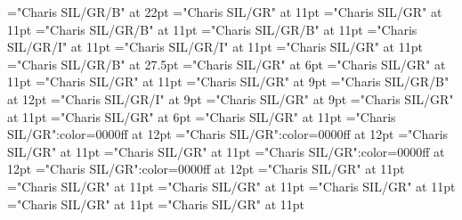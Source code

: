 \documentclass[a4paper,twoside]{article}
\begin{document}
\font\spanzxxTitleMainscrBookscrBody="Charis SIL/GR/B" at 22pt
\font\columnsscrBookscrBody="Charis SIL/GR" at 11pt
\font\scrSectioncolumnsscrBookscrBody="Charis SIL/GR" at 11pt
\font\SectionHeadscrSectioncolumnsscrBookscrBody="Charis SIL/GR/B" at 11pt
\font\spanzxxSectionHeadscrSectioncolumnsscrBookscrBody="Charis SIL/GR/B" at 11pt
\font\ParallelPassageReferencescrSectioncolumnsscrBookscrBody="Charis SIL/GR/I" at 11pt
\font\spanzxxParallelPassageReferencescrSectioncolumnsscrBookscrBody="Charis SIL/GR/I" at 11pt
\font\ParagraphscrSectioncolumnsscrBookscrBody="Charis SIL/GR" at 11pt
\font\ChapterNumberzxxParagraphscrSectioncolumnsscrBookscrBody="Charis SIL/GR/B" at 27.5pt
\font\VerseNumberzxxParagraphscrSectioncolumnsscrBookscrBody="Charis SIL/GR" at 6pt
\font\spanzxxParagraphscrSectioncolumnsscrBookscrBody="Charis SIL/GR" at 11pt
\font\scrFootnoteMarkerParagraphscrSectioncolumnsscrBookscrBody="Charis SIL/GR" at 11pt
\font\NoteGeneralParagraphParagraphscrSectioncolumnsscrBookscrBody="Charis SIL/GR" at 9pt
\font\NoteTargetReferencezxxNoteGeneralParagraphParagraphscrSectioncolumnsscrBookscrBody="Charis SIL/GR/B" at 12pt
\font\QuotedTextzxxNoteGeneralParagraphParagraphscrSectioncolumnsscrBookscrBody="Charis SIL/GR/I" at 9pt
\font\spanzxxNoteGeneralParagraphParagraphscrSectioncolumnsscrBookscrBody="Charis SIL/GR" at 9pt
\font\LinebscrSectioncolumnsscrBookscrBody="Charis SIL/GR" at 11pt
\font\VerseNumberzxxLinebscrSectioncolumnsscrBookscrBody="Charis SIL/GR" at 6pt
\font\spanzxxLinebscrSectioncolumnsscrBookscrBody="Charis SIL/GR" at 11pt
\font\SeeInGlossaryzxxLinebscrSectioncolumnsscrBookscrBody="Charis SIL/GR":color=0000ff at 12pt
\font\GlossaryKeySeeInGlossaryzxxLinebscrSectioncolumnsscrBookscrBody="Charis SIL/GR":color=0000ff at 12pt
\font\LinecscrSectioncolumnsscrBookscrBody="Charis SIL/GR" at 11pt
\font\spanzxxLinecscrSectioncolumnsscrBookscrBody="Charis SIL/GR" at 11pt
\font\SeeInGlossaryzxxParagraphscrSectioncolumnsscrBookscrBody="Charis SIL/GR":color=0000ff at 12pt
\font\GlossaryKeySeeInGlossaryzxxParagraphscrSectioncolumnsscrBookscrBody="Charis SIL/GR":color=0000ff at 12pt
\font\picturePageParagraphscrSectioncolumnsscrBookscrBody="Charis SIL/GR" at 11pt
\font\picturepicturePageParagraphscrSectioncolumnsscrBookscrBody="Charis SIL/GR" at 11pt
\font\pictureCaptionpicturePageParagraphscrSectioncolumnsscrBookscrBody="Charis SIL/GR" at 11pt
\font\spanzxxpictureCaptionpicturePageParagraphscrSectioncolumnsscrBookscrBody="Charis SIL/GR" at 11pt
\font{}="Charis SIL/GR" at 11pt
\font\pictureColumnParagraphscrSectioncolumnsscrBookscrBody="Charis SIL/GR" at 11pt
\end{document}
